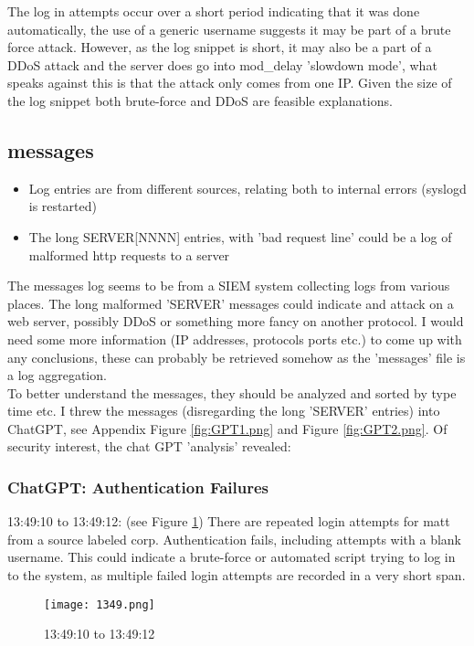 \documentclass[
	letterpaper, %
	10pt, %
	unnumberedsections, %
	twoside, %
]{APAAssignment}
\begin{document}
The log in attempts occur over a short period indicating that it was done automatically, the use of a generic username suggests it may be part of a brute force attack. However, as the log snippet is short, it may also be a part of a DDoS attack and the server does go into mod\_delay 'slowdown mode', what speaks against this is that the attack only comes from one IP. Given the size of the log snippet both brute-force and DDoS are feasible explanations. 

\subsection{messages}
\begin{itemize}
	\item Log entries are from different sources, relating both to internal errors (syslogd is restarted) 
	\item The long SERVER[NNNN] entries, with 'bad request line' could be a log of malformed http requests to a server
\end{itemize}
The messages log seems to be from a SIEM system collecting logs from various places.
The long malformed 'SERVER' messages could indicate and attack on a web server, possibly DDoS or something more fancy on another protocol. I would need some more information (IP addresses, protocols ports etc.) to come up with any conclusions, these can probably be retrieved somehow as the 'messages' file is a log aggregation. \\ 
To better understand the messages, they should be analyzed and sorted by type time etc. I threw the messages (disregarding the long 'SERVER' entries) into ChatGPT, see Appendix Figure \ref{fig:GPT1.png} and Figure \ref{fig:GPT2.png}. Of security interest, the chat GPT 'analysis' revealed: 

\subsubsection{ChatGPT: Authentication Failures} 13:49:10 to 13:49:12: (see Figure \ref{fig:1349}) There are repeated login attempts for matt from a source labeled corp. Authentication fails,  including attempts with a blank username. This could indicate a brute-force or automated script trying to log in to the system, as multiple failed login attempts are recorded in a very short span. \\

\begin{figure}[!htp] %
	\centering
	\texttt{[image: 1349.png]}
	\caption{13:49:10 to 13:49:12}	\label{fig:1349}
\end{figure}
\end{document}
